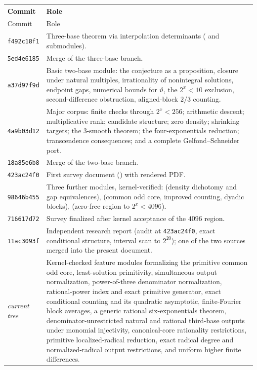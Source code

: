 \documentclass[11pt,oneside]{article}
\theoremstyle{definition}
\theoremstyle{remark}
\newcommand{\thetaq}{\vartheta}
\newcommand{\lean}[1]{\texttt{\detokenize{#1}}}
\newcommand{\commit}[1]{\texttt{#1}}
\begin{document}
\begin{longtable}{@{}p{}p{}@{}}
\toprule
Commit & Role \\
\midrule
\endfirsthead
\toprule
Commit & Role \\
\midrule
\endhead
\commit{f492c18f1} & Three-base theorem via interpolation determinants
(\lean{IntegerExponent} and submodules). \\
\addlinespace
\commit{5ed4e6185} & Merge of the three-base branch. \\
\addlinespace
\commit{a37d97f9d} & Basic two-base module: the conjecture as a proposition, closure under
natural multiples, irrationality of nonintegral solutions, endpoint gaps, numerical bounds
for $\thetaq$, the $2^x<10$ exclusion, second-difference obstruction, aligned-block $2/3$
counting. \\
\addlinespace
\commit{4a9b03d12} & Major corpus: finite checks through $2^x<256$; arithmetic descent;
multiplicative rank; candidate structure; zero density; shrinking targets; the $3$-smooth
theorem; the four-exponentials reduction; transcendence consequences; and a complete
Gelfond--Schneider port. \\
\addlinespace
\commit{18a85e6b8} & Merge of the two-base branch. \\
\addlinespace
\commit{423ac24f0} & First survey document (\lean{two-base-partial-results.tex}) with
rendered PDF. \\
\addlinespace
\commit{98646b455} & Three further modules, kernel-verified:
\lean{FractionalPartDensity} (density dichotomy and gap equivalences),
\lean{OddCore} (common odd core, improved counting, dyadic blocks),
\lean{FiniteCheck4096} (zero-free region to $2^x<4096$). \\
\addlinespace
\commit{716617d72} & Survey finalized after kernel acceptance of the $4096$ region. \\
\addlinespace
\commit{11ac3093f} & Independent research report (audit at \commit{423ac24f0}, exact
conditional structure, interval scan to $2^{20}$); one of the two sources merged into the
present document. \\
\addlinespace
\textit{current tree} & Kernel-checked feature modules formalizing the primitive common odd
core, least-solution primitivity, simultaneous output normalization, power-of-three denominator
normalization, rational-power index and exact primitive generator, exact conditional counting
and its quadratic asymptotic, finite-Fourier block averages, a generic rational
six-exponentials theorem, denominator-unrestricted natural and rational third-base outputs
under monomial injectivity,
canonical-core rationality restrictions, primitive localized-radical
reduction, exact radical degree and normalized-radical output restrictions, and uniform higher
finite differences. \\
\bottomrule
\end{longtable}
\end{document}
